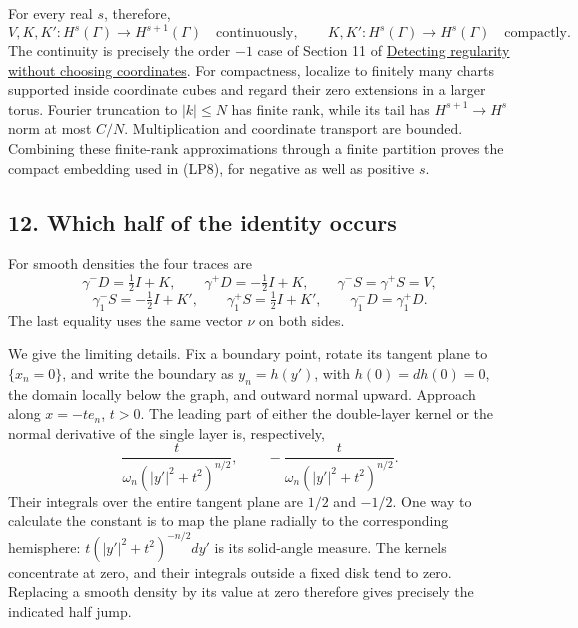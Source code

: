 \documentclass[
  11pt,
]{article}
\makeatletter
\let\ReaderOriginalAnchorStart\hyper@anchorstart
\let\ReaderOriginalAnchorEnd\hyper@anchorend
\let\ReaderPendingAliases\@empty
\def\ReaderArmAliases#1{\gdef\ReaderPendingAliases{#1}}
\def\hyper@anchorstart#1{\ReaderIfNativeAnchorTF{#1}{\ReaderPendingAliases\global\let\ReaderPendingAliases\@empty}{}\ReaderOriginalAnchorStart{#1}}
\makeatother
\begin{document}
For every real \(s\), therefore, \[
 V,K,K':H^s(\Gamma)\longrightarrow H^{s+1}(\Gamma)
 \quad\text{continuously},
 \qquad K,K':H^s(\Gamma)\longrightarrow H^s(\Gamma)
 \quad\text{compactly}.
 \tag{LP8}
\] The continuity is precisely the order \(-1\) case of Section 11 of
\href{geometric-microlocal-calculus.pdf}{Detecting regularity without
choosing coordinates}. For compactness, localize to finitely many charts
supported inside coordinate cubes and regard their zero extensions in a
larger torus. Fourier truncation to \(|k|\le N\) has finite rank, while
its tail has \(H^{s+1}\to H^s\) norm at most \(C/N\). Multiplication and
coordinate transport are bounded. Combining these finite-rank
approximations through a finite partition proves the compact embedding
used in (LP8), for negative as well as positive \(s\).

\ReaderArmAliases{\ReaderOriginalAnchorStart{AN03-SBD-012}\ReaderOriginalAnchorEnd\begingroup\expandafter\def\csname @currentHref\endcsname{AN03-SBD-012}\label{AN03-SBD-012}\endgroup\ReaderOriginalAnchorStart{an03-sbd-012-which-half-of-the-identity-occurs}\ReaderOriginalAnchorEnd\begingroup\expandafter\def\csname @currentHref\endcsname{an03-sbd-012-which-half-of-the-identity-occurs}\label{an03-sbd-012-which-half-of-the-identity-occurs}\endgroup\ReaderOriginalAnchorStart{12-which-half-of-the-identity-occurs}\ReaderOriginalAnchorEnd\begingroup\expandafter\def\csname @currentHref\endcsname{12-which-half-of-the-identity-occurs}\label{12-which-half-of-the-identity-occurs}\endgroup\ReaderOriginalAnchorStart{which-half-of-the-identity-occurs}\ReaderOriginalAnchorEnd}
\subsection{12. Which half of the identity
occurs}\label{which-half-of-the-identity-occurs}

For smooth densities the four traces are \[
 \gamma^-D=\tfrac12 I+K,\qquad\gamma^+D=-\tfrac12 I+K,
 \qquad\gamma^-S=\gamma^+S=V,
 \tag{LP9}
\] \[
 \gamma_1^-S=-\tfrac12 I+K',\qquad
 \gamma_1^+S=\tfrac12 I+K',\qquad
 \gamma_1^-D=\gamma_1^+D.
 \tag{LP10}
\] The last equality uses the same vector \(\nu\) on both sides.

We give the limiting details. Fix a boundary point, rotate its tangent
plane to \(\{x_n=0\}\), and write the boundary as \(y_n=h(y')\), with
\(h(0)=dh(0)=0\), the domain locally below the graph, and outward normal
upward. Approach along \(x=-t e_n\), \(t>0\). The leading part of either
the double-layer kernel or the normal derivative of the single layer is,
respectively, \[
 \frac{t}{\omega_n(|y'|^2+t^2)^{n/2}},\qquad
 -\frac{t}{\omega_n(|y'|^2+t^2)^{n/2}}.
 \tag{LP11}
\] Their integrals over the entire tangent plane are \(1/2\) and
\(-1/2\). One way to calculate the constant is to map the plane radially
to the corresponding hemisphere: \(t(|y'|^2+t^2)^{-n/2}dy'\) is its
solid-angle measure. The kernels concentrate at zero, and their
integrals outside a fixed disk tend to zero. Replacing a smooth density
by its value at zero therefore gives precisely the indicated half jump.
\end{document}
